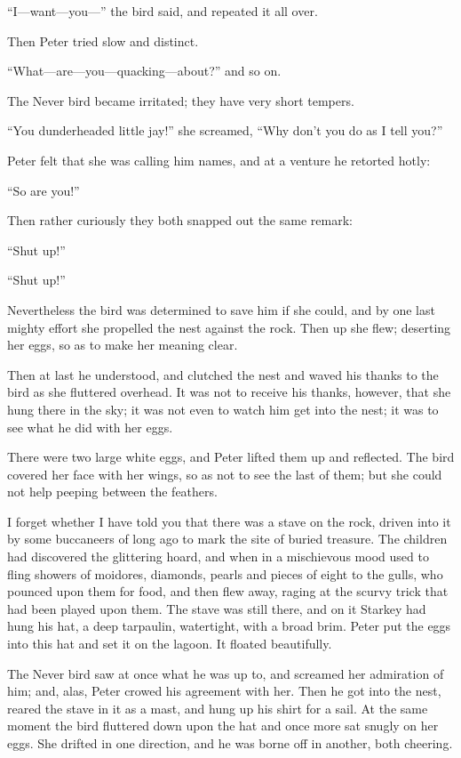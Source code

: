 ``I—want—you—'' the bird said, and repeated it all over.

Then Peter tried slow and distinct.

``What—are—you—quacking—about?'' and so on.

The Never bird became irritated; they have very short tempers.

``You dunderheaded little jay!'' she screamed, ``Why don't you do as I
tell you?''

Peter felt that she was calling him names, and at a venture he retorted
hotly:

``So are you!''

Then rather curiously they both snapped out the same remark:

``Shut up!''

``Shut up!''

Nevertheless the bird was determined to save him if she could, and by
one last mighty effort she propelled the nest against the rock. Then up
she flew; deserting her eggs, so as to make her meaning clear.

Then at last he understood, and clutched the nest and waved his thanks
to the bird as she fluttered overhead. It was not to receive his
thanks, however, that she hung there in the sky; it was not even to
watch him get into the nest; it was to see what he did with her eggs.

There were two large white eggs, and Peter lifted them up and
reflected. The bird covered her face with her wings, so as not to see
the last of them; but she could not help peeping between the feathers.

I forget whether I have told you that there was a stave on the rock,
driven into it by some buccaneers of long ago to mark the site of
buried treasure. The children had discovered the glittering hoard, and
when in a mischievous mood used to fling showers of moidores, diamonds,
pearls and pieces of eight to the gulls, who pounced upon them for
food, and then flew away, raging at the scurvy trick that had been
played upon them. The stave was still there, and on it Starkey had hung
his hat, a deep tarpaulin, watertight, with a broad brim. Peter put the
eggs into this hat and set it on the lagoon. It floated beautifully.

The Never bird saw at once what he was up to, and screamed her
admiration of him; and, alas, Peter crowed his agreement with her. Then
he got into the nest, reared the stave in it as a mast, and hung up his
shirt for a sail. At the same moment the bird fluttered down upon the
hat and once more sat snugly on her eggs. She drifted in one direction,
and he was borne off in another, both cheering.

